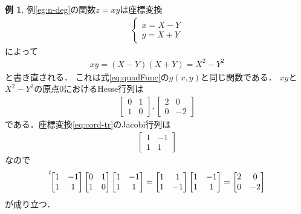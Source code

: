 \documentclass[11pt, a4paper, dvipdfmx]{jsarticle}
\theoremstyle{definition}
\theoremstyle{mystyle}
\newtheorem{EG}[Axiom]{例}
\numberwithin{equation}{section} %
\begin{document}
\begin{EG}
    例\ref{eg:n-deg}の関数$z=xy$は座標変換
    \begin{align}
        \begin{cases}
            x=X-Y\\
            y=X+Y
        \end{cases}\label{eq:cord-tr}
    \end{align}
    によって
    \begin{align*}
        xy=(X-Y)(X+Y)=X^2-Y^2
    \end{align*}
    と書き直される．
    これは式\eqref{eq:quadFunc}の$g(x,y)$と同じ関数である．
    $xy$と$X^2-Y^2$の原点0におけるHesse行列は
    \begin{align*}
        \begin{bmatrix*}
            0&1\\1&0
        \end{bmatrix*},
        \begin{bmatrix*}
            2&0\\0&-2
        \end{bmatrix*}
    \end{align*}
    である．座標変換\eqref{eq:cord-tr}のJacobi行列は
    \begin{align*}
        \begin{bmatrix*}
            1&-1\\1&1
        \end{bmatrix*}
    \end{align*}
    なので
    \begin{align*}
        \prescript{t\!}{}{\begin{bmatrix*}
            1&-1\\1&1
        \end{bmatrix*}}\begin{bmatrix*}
            0&1\\1&0
        \end{bmatrix*}\begin{bmatrix*}
            1&-1\\1&1
        \end{bmatrix*}
        =\begin{bmatrix*}
            1&1\\1&-1
        \end{bmatrix*}\begin{bmatrix*}
            1&-1\\1&1
        \end{bmatrix*}
        =\begin{bmatrix*}
            2&0\\0&-2
        \end{bmatrix*}
    \end{align*}
    が成り立つ．
\end{EG}
\end{document}
